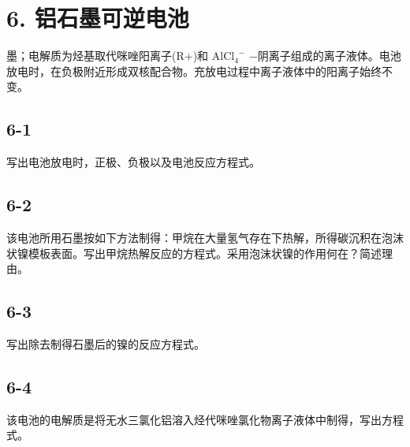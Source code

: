 \section*{6. 铝石墨可逆电池}
墨；电解质为烃基取代咪唑阳离⼦(R+)和 $\mathrm { { A l C l } _ { 4 } } ^ { - }$ −阴离⼦组成的离⼦液体。电池放电时，在负极附近形成双核配合物。充放电过程中离⼦液体中的阳离⼦始终不变。

\subsection*{6-1}
写出电池放电时，正极、负极以及电池反应⽅程式。

\subsection*{6-2}
该电池所⽤⽯墨按如下⽅法制得：甲烷在⼤量氢⽓存在下热解，所得碳沉积在泡沫状镍模板表⾯。写出甲烷热解反应的⽅程式。采⽤泡沫状镍的作⽤何在？简述理由。

\subsection*{6-3}
写出除去制得⽯墨后的镍的反应⽅程式。

\subsection*{6-4}
该电池的电解质是将⽆⽔三氯化铝溶⼊烃代咪唑氯化物离⼦液体中制得，写出⽅程式。
